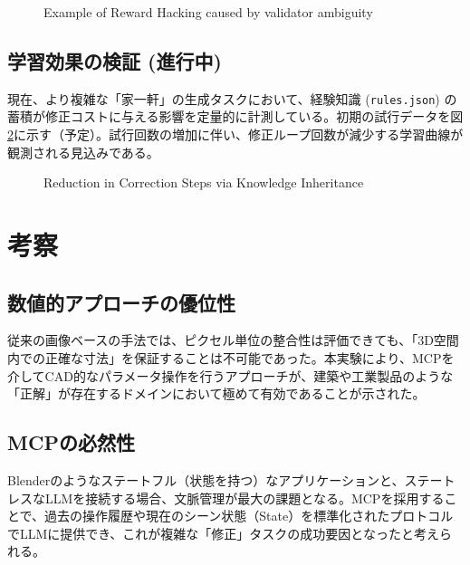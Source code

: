 \documentclass{deimj}
\begin{document}
\begin{figure}[t]
 \centering
 \caption{Example of Reward Hacking caused by validator ambiguity}
 \label{fig:reward_hacking}
\end{figure}

\subsection{学習効果の検証 (進行中)}
現在、より複雑な「家一軒」の生成タスクにおいて、経験知識 (\texttt{rules.json}) の蓄積が修正コストに与える影響を定量的に計測している。初期の試行データを図\ref{fig:learning_curve}に示す（予定）。試行回数の増加に伴い、修正ループ回数が減少する学習曲線が観測される見込みである。

\begin{figure}[t]
 \centering
 \caption{Reduction in Correction Steps via Knowledge Inheritance}
 \label{fig:learning_curve}
\end{figure}

\section{考察}

\subsection{数値的アプローチの優位性}
従来の画像ベースの手法では、ピクセル単位の整合性は評価できても、「3D空間内での正確な寸法」を保証することは不可能であった。本実験により、MCPを介してCAD的なパラメータ操作を行うアプローチが、建築や工業製品のような「正解」が存在するドメインにおいて極めて有効であることが示された。

\subsection{MCPの必然性}
Blenderのようなステートフル（状態を持つ）なアプリケーションと、ステートレスなLLMを接続する場合、文脈管理が最大の課題となる。MCPを採用することで、過去の操作履歴や現在のシーン状態（State）を標準化されたプロトコルでLLMに提供でき、これが複雑な「修正」タスクの成功要因となったと考えられる。
\end{document}
